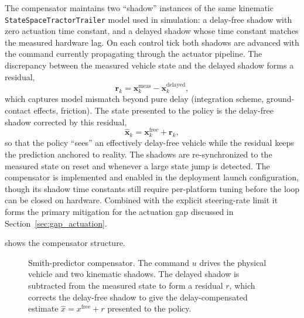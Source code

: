 The compensator maintains two ``shadow'' instances of the same kinematic \texttt{StateSpace\allowbreak TractorTrailer} model used in simulation: a delay-free shadow with zero actuation time constant, and a delayed shadow whose time constant matches the measured hardware lag. On each control tick both shadows are advanced with the command currently propagating through the actuator pipeline. The discrepancy between the measured vehicle state and the delayed shadow forms a residual,
\begin{equation}
    \mathbf{r}_k = \mathbf{x}^\text{meas}_k - \mathbf{x}^\text{delayed}_k,
    \label{eq:smith_residual}
\end{equation}
which captures model mismatch beyond pure delay (integration scheme, ground-contact effects, friction). The state presented to the policy is the delay-free shadow corrected by this residual,
\begin{equation}
    \hat{\mathbf{x}}_k = \mathbf{x}^\text{free}_k + \mathbf{r}_k,
    \label{eq:smith_predict}
\end{equation}
so that the policy ``sees'' an effectively delay-free vehicle while the residual keeps the prediction anchored to reality. The shadows are re-synchronized to the measured state on reset and whenever a large state jump is detected. The compensator is implemented and enabled in the deployment launch configuration, though its shadow time constants still require per-platform tuning before the loop can be closed on hardware. Combined with the explicit steering-rate limit it forms the primary mitigation for the actuation gap discussed in Section~\ref{sec:gap_actuation}.

 shows the compensator structure.

\begin{figure}[t]
  \centering
  
  \caption{Smith-predictor compensator. The command $u$ drives the physical vehicle and two kinematic shadows. The delayed shadow is subtracted from the measured state to form a residual $r$, which corrects the delay-free shadow to give the delay-compensated estimate $\hat{x} = x^{\mathrm{free}} + r$ presented to the policy.}
  \label{fig:smith_predictor}
\end{figure}

